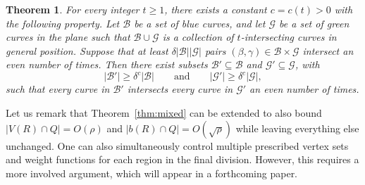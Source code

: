 \documentclass[11pt]{article}
\theoremstyle{plain}
\newtheorem{theorem}{Theorem}[section]
\theoremstyle{definition}
\theoremstyle{remark}
\begin{document}
\begin{theorem}\label{thm:dense-even}
For every integer \(t\ge 1\), there exists a constant \(c=c(t)>0\) with the
following property. Let \(\mathcal B\) be a set of blue curves, and let
\(\mathcal G\) be a set of green curves in the plane such that
\(\mathcal B\cup\mathcal G\) is a collection of \(t\)-intersecting curves in
general position. Suppose that at least
\(\delta|\mathcal B||\mathcal G|\) pairs
\((\beta,\gamma)\in\mathcal B\times\mathcal G\) intersect an even number of
times. Then there exist subsets
\(\mathcal B'\subseteq\mathcal B\) and
\(\mathcal G'\subseteq\mathcal G\), with
\[
|\mathcal B'|\ge \delta^c|\mathcal B|
\qquad\text{and}\qquad
|\mathcal G'|\ge \delta^c|\mathcal G|,
\]
such that every curve in \(\mathcal B'\) intersects every curve in
\(\mathcal G'\) an even number of times.
\end{theorem}










Let us remark that Theorem~\ref{thm:mixed} can be extended to also bound $|V(R)\cap Q|=O(\rho)$ and $|b(R)\cap Q|=O(\sqrt{\rho})$ while leaving everything else unchanged. One can also simultaneously control multiple prescribed vertex sets and weight functions for each region in the final division. However, this requires a more involved argument, which will appear in a forthcoming paper.
\end{document}
